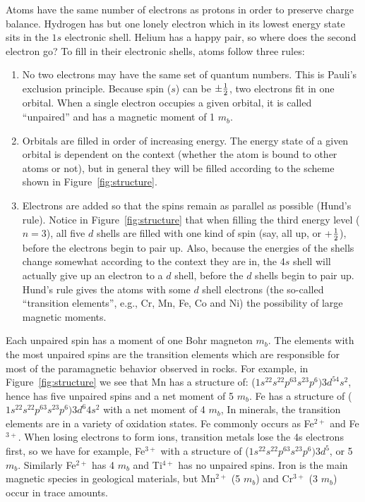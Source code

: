 {Atoms have the same number of electrons as protons in order to preserve charge balance.  Hydrogen has but one lonely electron which in its lowest energy state sits in the $1s$ electronic shell.  Helium has a happy pair, so where does the second electron go?  To fill in their electronic shells, atoms follow three rules:

\begin{enumerate}

\item No two electrons may have the same set of quantum numbers.  This is 
Pauli's exclusion principle.  Because spin ($s$) can be $\pm {1\over 2}$, two  electrons fit in one orbital.    When a single electron occupies a given orbital, it is called ``unpaired'' and has a magnetic moment of 1 $m_b$.  

\item Orbitals are filled in order of increasing energy.  The energy state of a given orbital is dependent on the context (whether the atom is bound to other atoms or not), but in general they will be filled according to the scheme shown in Figure~\ref{fig:structure}.  

\item Electrons are added so that the  spins remain as parallel as possible 
(Hund's rule).   Notice in  Figure~\ref{fig:structure} that when filling the third energy level ($n=3$), all five $d$ shells  are filled with one kind of spin (say, all up, or +$1\over 2$), before the electrons begin to pair up.  Also, because the energies of the shells change somewhat according to the context they are in, the 4$s$ shell will actually give up an electron to a $d$ shell, before the $d$ shells begin to pair up.    Hund's rule gives the atoms with some $d$ shell electrons (the so-called ``transition elements'', e.g.,  Cr, Mn, Fe, Co and Ni)  the possibility of large magnetic moments.    

\end{enumerate}


Each unpaired spin has a moment of one 
Bohr magneton $m_b$. 
  The elements with the most unpaired spins are the transition elements which  are responsible for 
most of the paramagnetic behavior observed in rocks.     For example, in  Figure~\ref{fig:structure} we see that Mn has a structure of: ($1s^22s^22p^63s^23p^6) 3d^54s^2$, hence has five unpaired spins and a net moment of 5 $m_b$.   Fe  has a structure of ($1s^22s^22p^63s^23p^6) 3d^6 4s^2$ with a net moment of 4 $m_b$,  In minerals, the transition elements are in a variety of oxidation states.  Fe commonly occurs as Fe$^{2+}$ and Fe$^{3+}$.  When losing electrons to form ions, transition metals lose the 4s electrons first, so we have for example, Fe$^{3+}$ with a structure of ($1s^22s^22p^63s^23p^6) 3d^5$, or 5 $m_b$.  Similarly Fe$^{2+}$ has 4 $m_b$ and Ti$^{4+}$ has no unpaired spins.  Iron is the main magnetic species in geological materials, but Mn$^{2+}$ (5 $m_b$) and Cr$^{3+}$ (3 $m_b$) occur in trace amounts.  




}
